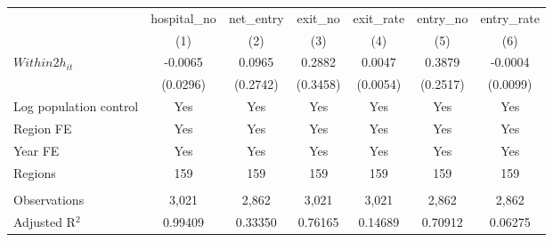 \begingroup
\centering
\begin{tabular}{lcccccc}
   \toprule
                          & hospital\_no  & net\_entry  & exit\_no  & exit\_rate  & entry\_no  & entry\_rate \\    
                          & (1)           & (2)         & (3)       & (4)         & (5)        & (6)\\  
   \midrule 
   $Within2h_{it}$        & -0.0065       & 0.0965      & 0.2882    & 0.0047      & 0.3879     & -0.0004\\   
                          & (0.0296)      & (0.2742)    & (0.3458)  & (0.0054)    & (0.2517)   & (0.0099)\\   
   Log population control & Yes           & Yes         & Yes       & Yes         & Yes        & Yes\\  
   Region FE              & Yes           & Yes         & Yes       & Yes         & Yes        & Yes\\  
   Year FE                & Yes           & Yes         & Yes       & Yes         & Yes        & Yes\\  
   Regions                & 159           & 159         & 159       & 159         & 159        & 159\\  
    \\
   Observations           & 3,021         & 2,862       & 3,021     & 3,021       & 2,862      & 2,862\\  
   Adjusted R$^2$         & 0.99409       & 0.33350     & 0.76165   & 0.14689     & 0.70912    & 0.06275\\  
   \bottomrule
\end{tabular}
\par\endgroup
